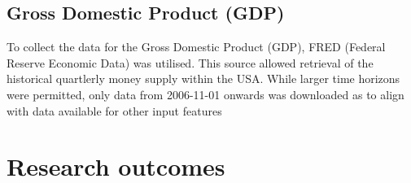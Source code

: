 \subsection{Gross Domestic Product (GDP)}

To collect the data for the Gross Domestic Product (GDP), FRED (Federal Reserve Economic Data) was utilised. This source allowed
retrieval of the historical quartlerly money supply within the USA. While larger time horizons were
permitted, only data from 2006-11-01 onwards was downloaded as to align with data available for
other input features

\section{Research outcomes}